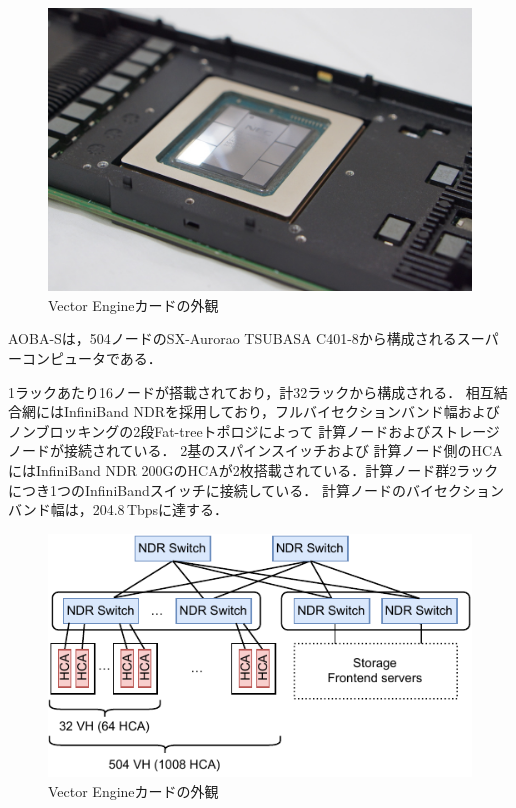 ﻿\documentclass[submit,techrep,noauthor]{ipsj}
\begin{document}
\begin{figure}
  \centering
  \includegraphics[width=.9\columnwidth]{figs/ve30.jpg}
  \caption{Vector Engineカードの外観}\label{fig:rack}
\end{figure}

AOBA-Sは，504ノードのSX-Aurorao TSUBASA C401-8から構成されるスーパーコンピュータである．

1ラックあたり16ノードが搭載されており，計32ラックから構成される．
相互結合網にはInfiniBand
NDRを採用しており，フルバイセクションバンド幅およびノンブロッキングの2段Fat-treeトポロジによって
計算ノードおよびストレージノードが接続されている．
2基のスパインスイッチおよび
計算ノード側のHCAにはInfiniBand NDR
200GのHCAが2枚搭載されている．計算ノード群2ラックにつき1つのInfiniBandスイッチに接続している．
計算ノードのバイセクションバンド幅は，204.8\,Tbpsに達する．

\begin{figure}
  \centering
  \includegraphics{figs/nw_topology.pdf}
  \caption{Vector Engineカードの外観}\label{fig:rack}
\end{figure}
\end{document}
